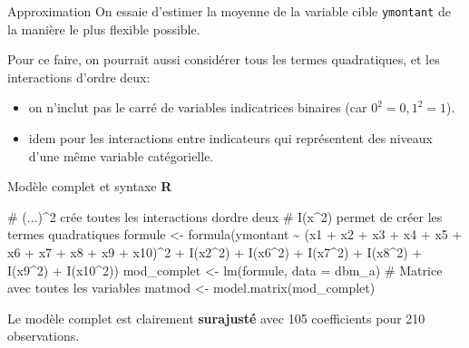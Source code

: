 \documentclass[
  ignorenonframetext,
]{beamer}
\newenvironment{Shaded}{\begin{snugshade}}{\end{snugshade}}
\newcommand{\AttributeTok}[1]{\textcolor[rgb]{0.40,0.45,0.13}{#1}}
\newcommand{\CommentTok}[1]{\textcolor[rgb]{0.37,0.37,0.37}{#1}}
\newcommand{\DecValTok}[1]{\textcolor[rgb]{0.68,0.00,0.00}{#1}}
\newcommand{\FunctionTok}[1]{\textcolor[rgb]{0.28,0.35,0.67}{#1}}
\newcommand{\NormalTok}[1]{\textcolor[rgb]{0.00,0.23,0.31}{#1}}
\newcommand{\OtherTok}[1]{\textcolor[rgb]{0.00,0.23,0.31}{#1}}
\newcommand{\SpecialCharTok}[1]{\textcolor[rgb]{0.37,0.37,0.37}{#1}}
\providecommand{\tightlist}{%
  \setlength{\itemsep}{0pt}\setlength{\parskip}{0pt}}\usepackage{longtable,booktabs,array}
\begin{document}
\begin{frame}[fragile]{Approximation}
\label{approximation}
On essaie d'estimer la moyenne de la variable cible \texttt{ymontant} de
la manière le plus flexible possible.

Pour ce faire, on pourrait aussi considérer tous les termes
quadratiques, et les interactions d'ordre deux:

\begin{itemize}
\tightlist
\item
  on n'inclut pas le carré de variables indicatrices binaires (car
  \(0^2=0, 1^2=1\)).
\item
  idem pour les interactions entre indicateurs qui représentent des
  niveaux d'une même variable catégorielle.
\end{itemize}
\end{frame}

\begin{frame}[fragile]{Modèle complet et syntaxe \textbf{R}}
\label{moduxe8le-complet-et-syntaxe-r}
\begin{Shaded}
\begin{Highlighting}[numbers=left,,]
\CommentTok{\# (...)\^{}2 crée toutes les interactions d\textquotesingle{}ordre deux}
\CommentTok{\# I(x\^{}2) permet de créer les termes quadratiques}
\NormalTok{formule }\OtherTok{\textless{}{-}} 
  \FunctionTok{formula}\NormalTok{(ymontant }\SpecialCharTok{\textasciitilde{}} 
\NormalTok{          (x1 }\SpecialCharTok{+}\NormalTok{ x2 }\SpecialCharTok{+}\NormalTok{ x3 }\SpecialCharTok{+}\NormalTok{ x4 }\SpecialCharTok{+}\NormalTok{ x5 }\SpecialCharTok{+} 
\NormalTok{             x6 }\SpecialCharTok{+}\NormalTok{ x7 }\SpecialCharTok{+}\NormalTok{ x8 }\SpecialCharTok{+}\NormalTok{ x9 }\SpecialCharTok{+}\NormalTok{ x10)}\SpecialCharTok{\^{}}\DecValTok{2} \SpecialCharTok{+} 
            \FunctionTok{I}\NormalTok{(x2}\SpecialCharTok{\^{}}\DecValTok{2}\NormalTok{) }\SpecialCharTok{+} \FunctionTok{I}\NormalTok{(x6}\SpecialCharTok{\^{}}\DecValTok{2}\NormalTok{) }\SpecialCharTok{+} \FunctionTok{I}\NormalTok{(x7}\SpecialCharTok{\^{}}\DecValTok{2}\NormalTok{) }\SpecialCharTok{+}
            \FunctionTok{I}\NormalTok{(x8}\SpecialCharTok{\^{}}\DecValTok{2}\NormalTok{) }\SpecialCharTok{+} \FunctionTok{I}\NormalTok{(x9}\SpecialCharTok{\^{}}\DecValTok{2}\NormalTok{) }\SpecialCharTok{+} \FunctionTok{I}\NormalTok{(x10}\SpecialCharTok{\^{}}\DecValTok{2}\NormalTok{))}
\NormalTok{mod\_complet }\OtherTok{\textless{}{-}} \FunctionTok{lm}\NormalTok{(formule, }\AttributeTok{data =}\NormalTok{ dbm\_a)}
\CommentTok{\# Matrice avec toutes les variables}
\NormalTok{matmod }\OtherTok{\textless{}{-}} \FunctionTok{model.matrix}\NormalTok{(mod\_complet)}
\end{Highlighting}
\end{Shaded}

Le modèle complet est clairement \textbf{surajusté} avec 105
coefficients pour 210 observations.
\end{frame}
\end{document}
